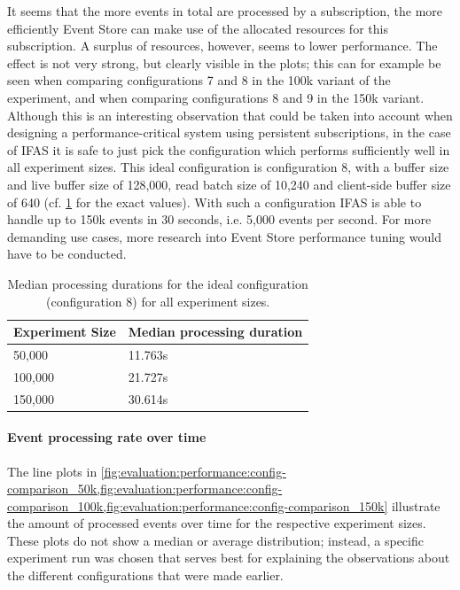 It seems that the more events in total are processed by a subscription, the more efficiently Event Store can make use of the allocated resources for this subscription.
A surplus of resources, however, seems to lower performance.
The effect is not very strong, but clearly visible in the plots; this can for example be seen when comparing configurations 7 and 8 in the 100k variant of the experiment, and when comparing configurations 8 and 9 in the 150k variant.
Although this is an interesting observation that could be taken into account when designing a performance-critical system using persistent subscriptions, in the case of \ac{IFAS} it is safe to just pick the configuration which performs sufficiently well in all experiment sizes.
This ideal configuration is configuration 8, with a buffer size and live buffer size of 128,000, read batch size of 10,240 and client-side buffer size of 640 (cf. \cref{table:median-durations-config-8} for the exact values).
With such a configuration \ac{IFAS} is able to handle up to 150k events in 30 seconds, i.e. 5,000 events per second.
For more demanding use cases, more research into Event Store performance tuning would have to be conducted.


\begin{table}
\centering
\caption{Median processing durations for the ideal configuration (configuration 8) for all experiment sizes.}
\begin{tabular}{l|l}
\textbf{Experiment Size} & \textbf{Median processing duration} \\ \hline
50,000 & 11.763s \\
100,000 & 21.727s \\
150,000 & 30.614s
\end{tabular}
\label{table:median-durations-config-8}
\end{table}

\paragraph{Event processing rate over time}

The line plots in \cref{fig:evaluation:performance:config-comparison_50k,fig:evaluation:performance:config-comparison_100k,fig:evaluation:performance:config-comparison_150k} illustrate the amount of processed events over time for the respective experiment sizes.
These plots do not show a median or average distribution; instead, a specific experiment run was chosen that serves best for explaining the observations about the different configurations that were made earlier.

